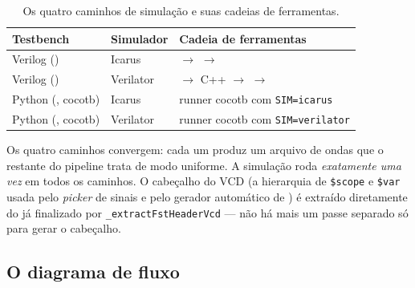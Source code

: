 \begin{table}[h]
\centering
\begin{tabularx}{\linewidth}{Y Y Y}
\toprule
\textbf{Testbench} & \textbf{Simulador} & \textbf{Cadeia de ferramentas} \\
\midrule
Verilog () & Icarus &  $\rightarrow$  $\rightarrow$  \\
Verilog () & Verilator &  $\rightarrow$ C++ $\rightarrow$  $\rightarrow$  \\
Python (, cocotb) & Icarus & runner cocotb com \lstinline|SIM=icarus| \\
Python (, cocotb) & Verilator & runner cocotb com \lstinline|SIM=verilator| \\
\bottomrule
\end{tabularx}
\caption{Os quatro caminhos de simulação e suas cadeias de ferramentas.}
\label{tab:09-quatro-caminhos}
\end{table}

Os quatro caminhos convergem: cada um produz um arquivo de ondas que o restante
do pipeline trata de modo uniforme. A simulação roda \emph{exatamente uma vez}
em todos os caminhos. O cabeçalho do VCD (a hierarquia de \lstinline|$scope| e
\lstinline|$var| usada pelo \emph{picker} de sinais e pelo gerador automático de
) é extraído diretamente do  já finalizado por
\lstinline|_extractFstHeaderVcd| --- não há mais um passe separado só para
gerar o cabeçalho.

\subsection{O diagrama de fluxo}

